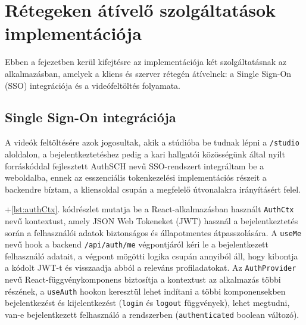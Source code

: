 \chapter{Rétegeken átívelő szolgáltatások implementációja}

Ebben a fejezetben kerül kifejtésre az implementációja két szolgáltatásnak az alkalmazásban, amelyek a kliens és szerver rétegén átívelnek: a Single Sign-On (SSO) integrációja és a videófeltöltés folyamata.

\section{Single Sign-On integrációja}

A videók feltöltésére azok jogosultak, akik a stúdióba be tudnak lépni a \verb|/studio| aloldalon, a bejelentkeztetéshez pedig a kari hallgatói közösségünk által nyílt forráskóddal fejlesztett AuthSCH nevű SSO-rendszert integráltam be a weboldalba, ennek az esszenciális tokenkezelési implementációs részeit a backendre bíztam, a kliensoldal csupán a megfelelő útvonalakra irányításért felel.

\Az+\ref{lst:authCtx}. kódrészlet mutatja be a React-alkalmazásban használt \verb|AuthCtx| nevű kontextust, amely JSON Web Tokeneket (JWT)\cite{jwt} használ a bejelentkeztetés során a felhasználói adatok biztonságos és állapotmentes átpasszolására. A \verb|useMe| nevű hook a backend \verb|/api/auth/me| végpontjáról kéri le a bejelentkezett felhasználó adatait, a végpont mögötti logika csupán annyiból áll, hogy kibontja a kódolt JWT-t és visszaadja abból a releváns profiladatokat. Az \verb|AuthProvider| nevű React-függvénykomponens biztosítja a kontextust az alkalmazás többi részének, a \verb|useAuth| hookon keresztül lehet indítani a többi komponensekben bejelentkezést és kijelentkezést (\verb|login| és \verb|logout| függvények), lehet megtudni, van-e bejelentkezett felhasználó a rendszerben (\verb|authenticated| boolean változó).

